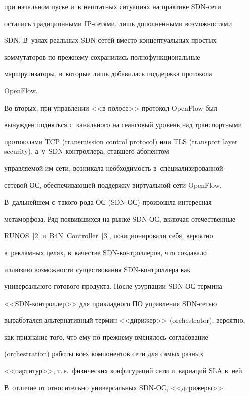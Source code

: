 при начальном пус\-ке и~в нештатных ситуациях на практике SDN-се\-ти 


остались традиционными IP-се\-тя\-ми, лишь дополненными возможностями 


SDN. В~узлах реальных SDN-се\-тей вмес\-то концептуальных прос\-тых 


коммутаторов по-преж\-не\-му сохранились полнофункциональные 


маршрутизаторы, в~которые лишь добавилась под\-держ\-ка протокола 


OpenFlow.


    


    Во-вторых, при управлении <<в полосе>> протокол OpenFlow был 


вынужден подняться с~канального на сеансовый уровень над транспортными 


протоколами TCP (transmission control protocol) или TLS (transport layer security), а~у~SDN-конт\-рол\-ле\-ра, ставшего абонентом 


управляемой им сети, возникала не\-об\-хо\-ди\-мость в~специализированной 


сетевой ОС, обеспечивающей поддержку виртуальной сети OpenFlow. 


В~дальнейшем с~такого рода ОС (SDN-ОС) произошла интересная 


метаморфоза. Ряд появившихся на рынке SDN-ОС, включая отечественные 


RUNOS~[2] и~B4N~Controller~[3], позиционировали себя, вероятно 


в~рекламных целях, в~качестве SDN-конт\-рол\-ле\-ров, что создавало 


иллюзию возможности существования SDN-конт\-рол\-ле\-ра как 


универсального готового продукта. После узурпации SDN-ОС термина 


<<SDN-конт\-рол\-лер>> для при\-клад\-но\-го ПО управ\-ле\-ния SDN-сетью 


выработался альтернативный термин <<дирижер>> (orchestrator), вероятно, 


как признание того, что ему по-преж\-не\-му вменялось согласование 


(orchestration) работы всех компонентов сети для самых разных 


<<партитур>>, т.\,е.\ физических конфигураций сети и~вариаций SLA в~ней. 


В~отличие от относительно универсальных SDN-ОС, <<дирижеры>>  



